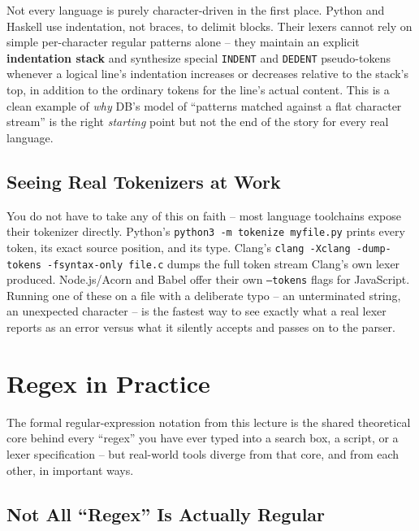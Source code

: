 \documentclass[full-course-notes.tex]{subfiles}
\begin{document}
Not every language is purely character-driven in the first place. Python and Haskell use
indentation, not braces, to delimit blocks. Their lexers cannot rely on simple per-character
regular patterns alone -- they maintain an explicit \textbf{indentation stack} and synthesize
special \texttt{INDENT} and \texttt{DEDENT} pseudo-tokens whenever a logical line's indentation
increases or decreases relative to the stack's top, in addition to the ordinary tokens for the
line's actual content. This is a clean example of \emph{why} DB's model of ``patterns matched
against a flat character stream'' is the right \emph{starting} point but not the end of the
story for every real language.

\subsection{Seeing Real Tokenizers at Work}

You do not have to take any of this on faith -- most language toolchains expose their tokenizer
directly. Python's \texttt{python3 -m tokenize myfile.py} prints every token, its exact source
position, and its type. Clang's \texttt{clang -Xclang -dump-tokens -fsyntax-only file.c} dumps
the full token stream Clang's own lexer produced. Node.js/Acorn and Babel offer their own
\texttt{--tokens} flags for JavaScript. Running one of these on a file with a deliberate typo --
an unterminated string, an unexpected character -- is the fastest way to see exactly what a
real lexer reports as an error versus what it silently accepts and passes on to the parser.

\section{Regex in Practice}
\label{sec:l4-regex-in-practice}

\beyonddb The formal regular-expression notation from this lecture is the shared theoretical
core behind every ``regex'' you have ever typed into a search box, a script, or a lexer
specification -- but real-world tools diverge from that core, and from each other, in
important ways.

\subsection{Not All ``Regex'' Is Actually Regular}
\end{document}
